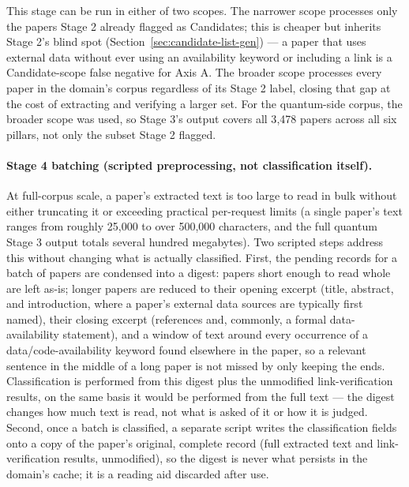 \documentclass[11pt]{article}
\begin{document}
This stage can be run in either of two scopes. The narrower scope processes only the
papers Stage 2 already flagged as Candidates; this is cheaper but inherits Stage 2's
blind spot (Section~\ref{sec:candidate-list-gen}) --- a paper that uses external data
without ever using an availability keyword or including a link is a Candidate-scope
false negative for Axis A. The broader scope processes every paper in the domain's
corpus regardless of its Stage 2 label, closing that gap at the cost of extracting and
verifying a larger set. For the quantum-side corpus, the broader scope was used, so
Stage 3's output covers all 3{,}478 papers across all six pillars, not only the subset
Stage 2 flagged.

\paragraph{Stage 4 batching (scripted preprocessing, not classification itself).} At
full-corpus scale, a paper's extracted text is too large to read in bulk without either
truncating it or exceeding practical per-request limits (a single paper's text ranges
from roughly 25{,}000 to over 500{,}000 characters, and the full quantum Stage 3 output
totals several hundred megabytes). Two scripted steps address this without changing what
is actually classified. First, the pending records for a batch of papers are condensed
into a digest: papers short enough to read whole are left as-is; longer papers are
reduced to their opening excerpt (title, abstract, and introduction, where a paper's
external data sources are typically first named), their closing excerpt (references and,
commonly, a formal data-availability statement), and a window of text around every
occurrence of a data/code-availability keyword found elsewhere in the paper, so a
relevant sentence in the middle of a long paper is not missed by only keeping the ends.
Classification is performed from this digest plus the unmodified link-verification
results, on the same basis it would be performed from the full text --- the digest
changes how much text is read, not what is asked of it or how it is judged. Second,
once a batch is classified, a separate script writes the classification fields onto a
copy of the paper's original, complete record (full extracted text and link-verification
results, unmodified), so the digest is never what persists in the domain's cache; it is
a reading aid discarded after use.
\end{document}
